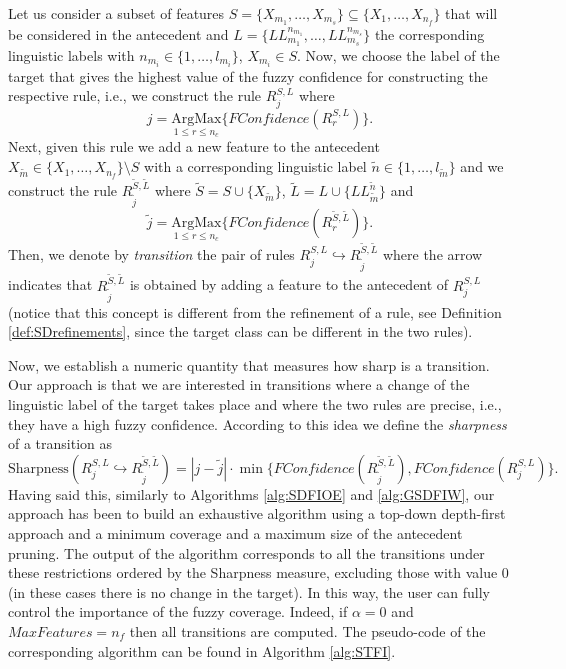 
Let us consider a subset of features $S=\{X_{m_1},\dots,X_{m_s}\} \subseteq \{X_1,\dots,X_{n_f}\}$ that will be considered in the antecedent and $L=\{LL^{n_{m_1}}_{m_1},\dots, LL^{n_{m_s}}_{m_s}\}$ the corresponding linguistic labels  with $n_{m_i} \in \{1,\dots,l_{m_i}\}$, $X_{m_i} \in S$. Now, we choose the label of the target that gives the highest value of the fuzzy confidence for constructing the respective rule, i.e., we construct the rule  $R_j^{S,L}$ where
$$j= \underset{1 \leq r \leq n_c}{\text{ArgMax}} \{FConfidence(R_r^{S,L}) \}.$$
Next, given this rule we add a new feature to the antecedent $X_{\tilde{m}} \in \{X_1,\dots,X_{n_f}\} \setminus S$ with a corresponding linguistic label $\tilde{n} \in \{1,\dots,l_{\tilde{m}}\}$ and we construct the rule $R_{\tilde{j}}^{\tilde{S},\tilde{L}}$ where $\tilde{S} = S \cup \{X_{\tilde{m}}\}$, $\tilde{L} = L \cup \{LL^{\tilde{n}}_{\tilde{m}}\}$ and
$$\tilde{j}= \underset{1 \leq r \leq n_c}{\text{ArgMax}} \{FConfidence(R_r^{\tilde{S},\tilde{L}}) \}.$$
Then, we denote by \emph{transition} the pair of rules $R_j^{S,L} \hookrightarrow R_{\tilde{j}}^{\tilde{S},\tilde{L}}$ where the arrow indicates that $R_{\tilde{j}}^{\tilde{S},\tilde{L}}$ is obtained by adding a feature to the antecedent of $R_j^{S,L}$ (notice that this concept is different from the refinement of a rule, see Definition \ref{def:SDrefinements}, since the target class can be different in the two rules). 


Now, we establish a numeric quantity that measures how sharp is a transition. Our approach is that we are interested in transitions where a change of the linguistic label of the target takes place and where the two rules are precise, i.e., they have a high fuzzy confidence. According to this idea we define the \textit{sharpness} of a transition as 
$$
\text{Sharpness}(R_j^{S,L} \hookrightarrow R_{\tilde{j}}^{\tilde{S},\tilde{L}})=|j-\tilde{j}| \cdot \min\{FConfidence(R_{\tilde{j}}^{\tilde{S},\tilde{L}}),
FConfidence(R_{j}^{S,L})\}.
$$
Having said this, similarly to Algorithms \ref{alg:SDFIOE} and \ref{alg:GSDFIW}, our approach has been to build an exhaustive algorithm using a top-down depth-first approach and a minimum coverage and a maximum size of the antecedent pruning. The output of the algorithm corresponds to all the transitions under these restrictions ordered by the Sharpness measure, excluding those with value 0 (in these cases there is no change in the target).  In this way, the user can fully control the importance of the fuzzy coverage. Indeed, if $\alpha=0$ and $MaxFeatures=n_f$ then all transitions are computed. The pseudo-code of the corresponding algorithm can be found in  Algorithm \ref{alg:STFI}.

